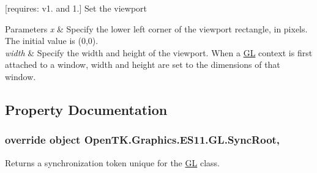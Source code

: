 \mbox{[}requires\-: v1. and 1.\mbox{]} Set the viewport 


\begin{DoxyParams}{Parameters}
{\em x} & Specify the lower left corner of the viewport rectangle, in pixels. The initial value is (0,0). \\
\hline
{\em width} & Specify the width and height of the viewport. When a \hyperlink{class_open_t_k_1_1_graphics_1_1_e_s11_1_1_g_l}{G\-L} context is first attached to a window, width and height are set to the dimensions of that window. \\
\hline
\end{DoxyParams}


\subsection{Property Documentation}
\hypertarget{class_open_t_k_1_1_graphics_1_1_e_s11_1_1_g_l_a3e9dec98d8cd98534b030c049c29420d}{
\subsubsection[{Sync\-Root}]{\setlength{\rightskip}{0pt plus 5cm}override object Open\-T\-K.\-Graphics.\-E\-S11.\-G\-L.\-Sync\-Root\hspace{0.3cm}{\ttfamily [get]}, {\ttfamily [protected]}}}\label{class_open_t_k_1_1_graphics_1_1_e_s11_1_1_g_l_a3e9dec98d8cd98534b030c049c29420d}


Returns a synchronization token unique for the \hyperlink{class_open_t_k_1_1_graphics_1_1_e_s11_1_1_g_l}{G\-L} class. 

